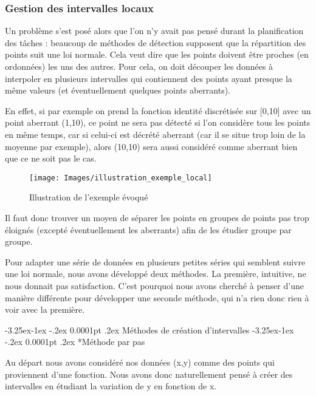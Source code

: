 \documentclass[a4paper,12pt]{article} %
\makeatletter
\renewcommand\paragraph{\@startsection{paragraph}{4}{\z@}%
                                      {-3.25ex\@plus -1ex \@minus -.2ex}%
                                      {0.0001pt \@plus .2ex}%
                                      {\normalfont\normalsize\bfseries}}
\renewcommand\subparagraph{\@startsection{subparagraph}{5}{\z@}%
                                      {-3.25ex\@plus -1ex \@minus -.2ex}%
                                      {0.0001pt \@plus .2ex}%
                                      {\normalfont\normalsize\bfseries}}
\makeatother
\begin{document}
		    \subsubsection{Gestion des intervalles locaux}  
    			Un problème s'est posé alors que l'on n'y avait pas pensé durant la planification des tâches : beaucoup de méthodes de détection supposent que la répartition des points suit une loi normale. Cela veut dire que les points doivent être proches (en ordonnées) les uns des autres. Pour cela, on doit découper les données à interpoler en plusieurs intervalles qui contiennent des points ayant presque la même valeurs (et éventuellement quelques points aberrants).
    				
    			En effet, si par exemple on prend la fonction identité discrétisée sur [0,10] avec un point aberrant (1,10), ce point ne sera pas détecté si l'on considère tous les points en même temps, car si celui-ci est décrété aberrant (car il se situe trop loin de la moyenne par exemple), alors (10,10) sera aussi considéré comme aberrant bien que ce ne soit pas le cas. 
    				
    			\begin{figure}[H]
                \begin{center}
                \texttt{[image: Images/illustration\_exemple\_local]} 
                \end{center}
                \caption{Illustration de l'exemple évoqué}
                \label{NUL3}
                \end{figure}
    				
    			Il faut donc trouver un moyen de séparer les points en groupes de points pas trop éloignés (excepté éventuellement les aberrants) afin de les étudier groupe par groupe.
    				
    				
			   Pour adapter une série de données en plusieurs petites séries qui semblent suivre une loi normale, nous avons développé deux méthodes. La première, intuitive, ne nous donnait pas satisfaction. C'est pourquoi nous avons cherché à penser d'une manière différente pour développer une seconde méthode, qui n'a rien donc rien à voir avec la première.
		
		
			    \paragraph{Méthodes de création d'intervalles}
		            \subparagraph*{Méthode par pas}
			    
    			        Au départ nous avons considéré nos données (x,y) comme des points qui proviennent d'une fonction. Nous avons donc naturellement pensé à créer des intervalles en étudiant la variation de y en fonction de x.\\
    				    
\end{document}
